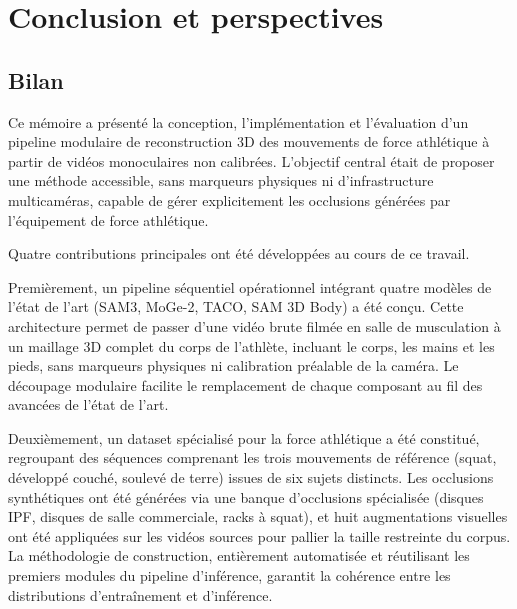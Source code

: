 
\chapter{Conclusion et perspectives} \label{ch_six}

\section{Bilan}

Ce mémoire a présenté la conception, l'implémentation et l'évaluation d'un pipeline modulaire de reconstruction 3D des mouvements de force athlétique à partir de vidéos monoculaires non calibrées. L'objectif central était de proposer une méthode accessible, sans marqueurs physiques ni d'infrastructure multicaméras, capable de gérer explicitement les occlusions générées par l'équipement de force athlétique.

Quatre contributions principales ont été développées au cours de ce travail.

Premièrement, un pipeline séquentiel opérationnel intégrant quatre modèles de l'état de l'art (SAM3, MoGe-2, TACO, SAM 3D Body) a été conçu. Cette architecture permet de passer d'une vidéo brute filmée en salle de musculation à un maillage 3D complet du corps de l'athlète, incluant le corps, les mains et les pieds, sans marqueurs physiques ni calibration préalable de la caméra. Le découpage modulaire facilite le remplacement de chaque composant au fil des avancées de l'état de l'art.

Deuxièmement, un dataset spécialisé pour la force athlétique a été constitué, regroupant des séquences comprenant les trois mouvements de référence (squat, développé couché, soulevé de terre) issues de six sujets distincts. Les occlusions synthétiques ont été générées via une banque d'occlusions spécialisée (disques IPF, disques de salle commerciale, racks à squat), et huit augmentations visuelles ont été appliquées sur les vidéos sources pour pallier la taille restreinte du corpus. La méthodologie de construction, entièrement automatisée et réutilisant les premiers modules du pipeline d'inférence, garantit la cohérence entre les distributions d'entraînement et d'inférence.

